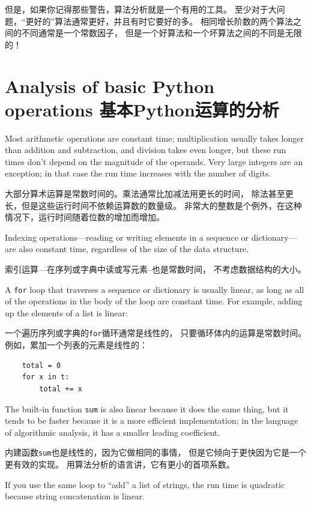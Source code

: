 \documentclass[10pt]{book}
\begin{document}
\begin{CJK}{UTF8}{gbsn}
但是，如果你记得那些警告，算法分析就是一个有用的工具。
至少对于大问题，``更好的''算法通常更好，并且有时它要好的多。
相同增长阶数的两个算法之间的不同通常是一个常数因子，
但是一个好算法和一个坏算法之间的不同是无限的！

\section{Analysis of basic Python operations 基本Python运算的分析}

Most arithmetic operations are constant time; multiplication
usually takes longer than addition and subtraction, and division
takes even longer, but these run times don't
depend on the magnitude of the operands.  Very large integers
are an exception; in that case the run time increases
with the number of digits.

大部分算术运算是常数时间的。乘法通常比加减法用更长的时间，
除法甚至更长，但是这些运行时间不依赖运算数的数量级。
非常大的整数是个例外，在这种情况下，运行时间随着位数的增加而增加。

Indexing operations---reading or writing elements in a sequence
or dictionary---are also constant time, regardless of the size
of the data structure.

索引运算---在序列或字典中读或写元素--也是常数时间，
不考虑数据结构的大小。

A {\tt for} loop that traverses a sequence or dictionary is
usually linear, as long as all of the operations in the body
of the loop are constant time.  For example, adding up the
elements of a list is linear:

一个遍历序列或字典的{\tt for}循环通常是线性的，
只要循环体内的运算是常数时间。
例如，累加一个列表的元素是线性的：

\begin{verbatim}
    total = 0
    for x in t:
        total += x
\end{verbatim}

The built-in function {\tt sum} is also linear because it does
the same thing, but it tends to be faster because it is a more
efficient implementation; in the language of algorithmic analysis,
it has a smaller leading coefficient.

内建函数{\tt sum}也是线性的，因为它做相同的事情，
但是它倾向于更快因为它是一个更有效的实现。
用算法分析的语言讲，它有更小的首项系数。

If you use the same loop to ``add'' a list of strings, the
run time is quadratic
because string concatenation is linear.


\end{CJK}
\end{document}
